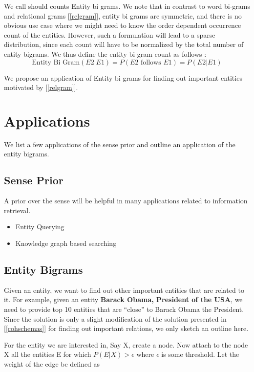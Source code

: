 We call should counts Entity bi grams. We note that in contrast to word bi-grams and relational grams [\ref{relgram}], entity bi grams
are symmetric, and there is no obvious use case where we might need to know the order dependent occurrence count of the entities. 
However, such a formulation will lead to a sparse distribution, since each count will have to be normalized by the total number of 
entity bigrams. We thus define the entity bi gram count as follows : 
\begin{equation}
 \tag{2}
 \text{Entity Bi Gram}(E2 | E1) = P(E2\text{ follows }E1) = P(E2 | E1) 
\end{equation}

We propose an application of Entity bi grams for finding out important entities motivated by [\ref{relgram}].

\section{Applications}
We list a few applications of the sense prior and outline an application of the entity bigrams.

 \subsection{Sense Prior}
 A prior over the sense will be helpful in many applications related to information retrieval. 
 \begin{itemize}
  \item Entity Querying
  \item Knowledge graph based searching
 \end{itemize}

 \subsection{Entity Bigrams}
 
 Given an entity, we want to find out other important entities that are related to it.
 For example, given an entity \textbf{Barack Obama, President of the USA}, we need to provide top 10 entities that are
 ``close'' to Barack Obama the President. Since the solution is only a slight modification of the solution 
 presented in [\ref{cohschemas}] for finding out important relations, we only sketch an outline here. 
 
For the entity we are interested in, Say X, create a node. Now attach to the node X all the entities E for which
$P(E|X) >  \epsilon$ where $\epsilon$ is some threshold. Let the weight of the edge be defined as

